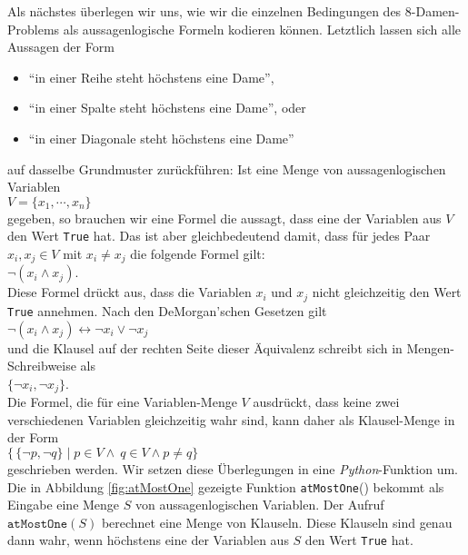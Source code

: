 Als nächstes überlegen wir uns, wie wir die einzelnen Bedingungen des 8-Damen-Problems 
als aussagenlogische
Formeln kodieren können.  Letztlich lassen sich alle Aussagen der Form
\begin{itemize}
\item ``in einer Reihe steht höchstens eine Dame'', 
\item ``in einer Spalte steht höchstens eine Dame'', oder 
\item ``in einer Diagonale steht höchstens eine Dame'' 
\end{itemize}
auf dasselbe Grundmuster zurückführen:
Ist eine Menge von aussagenlogischen Variablen \\[0.2cm]
\hspace*{1.3cm} $V = \{ x_1, \cdots, x_n \}$ \\[0.2cm]
gegeben, so brauchen wir eine Formel die aussagt, dass  eine der Variablen aus
$V$ den Wert \texttt{True} hat.  Das ist aber gleichbedeutend damit, dass für jedes Paar
$x_i, x_j \in V$ mit $x_i \not= x_j$ die folgende Formel gilt: \\[0.2cm]
\hspace*{1.3cm} $\neg (x_i \wedge x_j)$. \\[0.2cm]
Diese Formel drückt aus, dass die Variablen $x_i$ und $x_j$ nicht gleichzeitig den Wert
\texttt{True} annehmen.  Nach den De\-Morgan'schen Gesetzen gilt
\\[0.2cm]
\hspace*{1.3cm}
$\neg (x_i \wedge x_j) \leftrightarrow \neg x_i \vee \neg x_j$
\\[0.2cm]
und die Klausel auf der rechten Seite dieser Äquivalenz schreibt sich in Mengen-Schreibweise als
\\[0.2cm]
\hspace*{1.3cm}  $\{\neg x_i, \neg x_j \}$. \\[0.2cm]
Die Formel, die für eine Variablen-Menge $V$ ausdrückt, dass keine zwei verschiedenen
Variablen gleichzeitig wahr sind, kann daher als Klausel-Menge in der Form
\\[0.2cm]
\hspace*{1.3cm}
$\bigl\{\, \{ \neg p, \neg q \} \;|\; p \in V \wedge\ q \in V \wedge p \not= q \bigr\}$
\\[0.2cm]
geschrieben werden.
Wir setzen diese Überlegungen in eine \textsl{Python}-Funktion um.  Die in Abbildung \ref{fig:atMostOne}
gezeigte Funktion \texttt{atMostOne}() bekommt als Eingabe eine Menge $S$ von
aussagenlogischen Variablen.  Der Aufruf $\texttt{atMostOne}(S)$ berechnet eine Menge von
Klauseln.  Diese Klauseln sind genau dann wahr, wenn höchstens eine der Variablen aus $S$
den Wert \texttt{True} hat.

